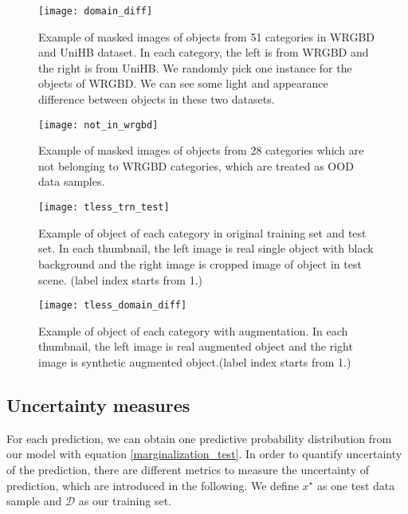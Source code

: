  \begin{figure}[H]
 	\begin{center}
 		\texttt{[image: domain\_diff]}
 		\caption{Example of masked images of objects from 51 categories in WRGBD and UniHB dataset. In each category, the left is from WRGBD and the right is from UniHB. We randomly pick one instance for the objects of WRGBD. We can see some light and appearance difference between objects in these two datasets.}		
 		\label{fig:wrgbd2}
 	\end{center}
 \end{figure}

\begin{figure}[H]
	\begin{center}
		\texttt{[image: not\_in\_wrgbd]}
		\caption{Example of masked images of objects from 28 categories which are not belonging to WRGBD categories, which are treated as OOD data samples.}		
		\label{fig:not_in_wrgbd}
	\end{center}
\end{figure} 

\begin{figure}[H]
	\begin{center}
		\texttt{[image: tless\_trn\_test]}
		\caption{Example of object of each category in original training set and test set. In each thumbnail, the left image is real single object with black background and the right image is cropped image of object in test scene. (label index starts from 1.)}		
		\label{fig:tless_test}
	\end{center}
\end{figure} 

\begin{figure}[H]
		\centering
		\texttt{[image: tless\_domain\_diff]}
		\caption{Example of object of each category with augmentation. In each thumbnail, the left image is real augmented object and the right image is synthetic augmented object.(label index starts from 1.)}		
		\label{fig:tless_train}
\end{figure} 


\subsection{Uncertainty measures}
For each prediction, we can obtain one predictive probability distribution from our model with equation \ref{marginalization_test}. In order to quantify uncertainty of the prediction, there are different metrics to measure the uncertainty of prediction, which are introduced in the following. We define $x^\star$ as one test data sample and $\mathcal D$ as our training set. 
